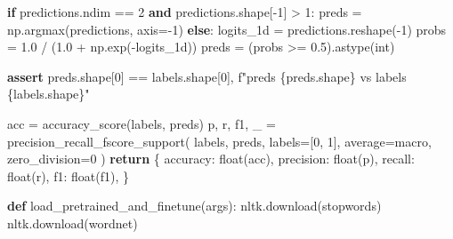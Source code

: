 \documentclass[
  letterpaper,
  DIV=11,
  numbers=noendperiod]{scrartcl}
\newenvironment{Shaded}{\begin{snugshade}}{\end{snugshade}}
\newcommand{\BuiltInTok}[1]{\textcolor[rgb]{0.00,0.23,0.31}{#1}}
\newcommand{\ControlFlowTok}[1]{\textcolor[rgb]{0.00,0.23,0.31}{\textbf{#1}}}
\newcommand{\DecValTok}[1]{\textcolor[rgb]{0.68,0.00,0.00}{#1}}
\newcommand{\FloatTok}[1]{\textcolor[rgb]{0.68,0.00,0.00}{#1}}
\newcommand{\KeywordTok}[1]{\textcolor[rgb]{0.00,0.23,0.31}{\textbf{#1}}}
\newcommand{\NormalTok}[1]{\textcolor[rgb]{0.00,0.23,0.31}{#1}}
\newcommand{\OperatorTok}[1]{\textcolor[rgb]{0.37,0.37,0.37}{#1}}
\newcommand{\SpecialCharTok}[1]{\textcolor[rgb]{0.37,0.37,0.37}{#1}}
\newcommand{\SpecialStringTok}[1]{\textcolor[rgb]{0.13,0.47,0.30}{#1}}
\newcommand{\StringTok}[1]{\textcolor[rgb]{0.13,0.47,0.30}{#1}}
\begin{document}
\begin{Shaded}
\begin{Highlighting}[]
    \ControlFlowTok{if}\NormalTok{ predictions.ndim }\OperatorTok{==} \DecValTok{2} \KeywordTok{and}\NormalTok{ predictions.shape[}\OperatorTok{{-}}\DecValTok{1}\NormalTok{] }\OperatorTok{\textgreater{}} \DecValTok{1}\NormalTok{:}
\NormalTok{        preds }\OperatorTok{=}\NormalTok{ np.argmax(predictions, axis}\OperatorTok{={-}}\DecValTok{1}\NormalTok{)}
    \ControlFlowTok{else}\NormalTok{:}
\NormalTok{        logits\_1d }\OperatorTok{=}\NormalTok{ predictions.reshape(}\OperatorTok{{-}}\DecValTok{1}\NormalTok{)}
\NormalTok{        probs }\OperatorTok{=} \FloatTok{1.0} \OperatorTok{/}\NormalTok{ (}\FloatTok{1.0} \OperatorTok{+}\NormalTok{ np.exp(}\OperatorTok{{-}}\NormalTok{logits\_1d))}
\NormalTok{        preds }\OperatorTok{=}\NormalTok{ (probs }\OperatorTok{\textgreater{}=} \FloatTok{0.5}\NormalTok{).astype(}\BuiltInTok{int}\NormalTok{)}


    \ControlFlowTok{assert}\NormalTok{ preds.shape[}\DecValTok{0}\NormalTok{] }\OperatorTok{==}\NormalTok{ labels.shape[}\DecValTok{0}\NormalTok{], }\SpecialStringTok{f"preds }\SpecialCharTok{\{}\NormalTok{preds}\SpecialCharTok{.}\NormalTok{shape}\SpecialCharTok{\}}\SpecialStringTok{ vs labels }\SpecialCharTok{\{}\NormalTok{labels}\SpecialCharTok{.}\NormalTok{shape}\SpecialCharTok{\}}\SpecialStringTok{"}

\NormalTok{    acc }\OperatorTok{=}\NormalTok{ accuracy\_score(labels, preds)}
\NormalTok{    p, r, f1, \_ }\OperatorTok{=}\NormalTok{ precision\_recall\_fscore\_support(}
\NormalTok{        labels, preds, labels}\OperatorTok{=}\NormalTok{[}\DecValTok{0}\NormalTok{, }\DecValTok{1}\NormalTok{], average}\OperatorTok{=}\StringTok{\textquotesingle{}macro\textquotesingle{}}\NormalTok{, zero\_division}\OperatorTok{=}\DecValTok{0}
\NormalTok{    )}
    \ControlFlowTok{return}\NormalTok{ \{}
        \StringTok{\textquotesingle{}accuracy\textquotesingle{}}\NormalTok{: }\BuiltInTok{float}\NormalTok{(acc),}
        \StringTok{\textquotesingle{}precision\textquotesingle{}}\NormalTok{: }\BuiltInTok{float}\NormalTok{(p),}
        \StringTok{\textquotesingle{}recall\textquotesingle{}}\NormalTok{: }\BuiltInTok{float}\NormalTok{(r),}
        \StringTok{\textquotesingle{}f1\textquotesingle{}}\NormalTok{: }\BuiltInTok{float}\NormalTok{(f1),}
\NormalTok{    \}}






\KeywordTok{def}\NormalTok{ load\_pretrained\_and\_finetune(args):}
\NormalTok{    nltk.download(}\StringTok{\textquotesingle{}stopwords\textquotesingle{}}\NormalTok{)}
\NormalTok{    nltk.download(}\StringTok{\textquotesingle{}wordnet\textquotesingle{}}\NormalTok{)}


\end{Highlighting}
\end{Shaded}
\end{document}
